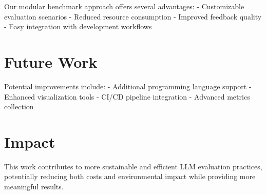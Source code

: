 Our modular benchmark approach offers several advantages:
- Customizable evaluation scenarios
- Reduced resource consumption
- Improved feedback quality
- Easy integration with development workflows

\section{Future Work}

Potential improvements include:
- Additional programming language support
- Enhanced visualization tools
- CI/CD pipeline integration
- Advanced metrics collection

\section{Impact}

This work contributes to more sustainable and efficient LLM evaluation practices, potentially reducing both costs and environmental impact while providing more meaningful results.
